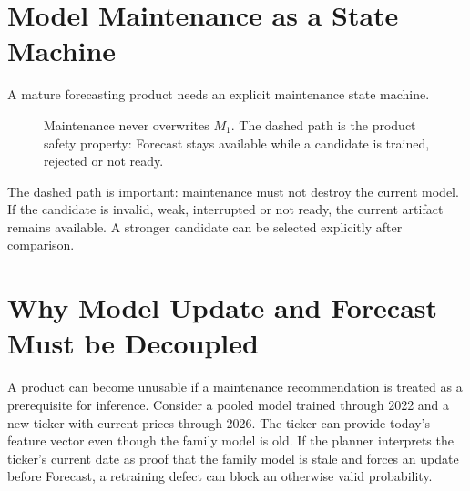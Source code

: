 \documentclass[11pt]{article}
\begin{document}
\section{Model Maintenance as a State Machine}
A mature forecasting product needs an explicit maintenance state machine.
\begin{figure}[ht]
\centering
{}
\caption{Maintenance never overwrites $M_1$. The dashed path is the product safety property: Forecast stays available while a candidate is trained, rejected or not ready.}
\end{figure}

The dashed path is important: maintenance must not destroy the current model. If the candidate is invalid, weak, interrupted or not ready, the current artifact remains available. A stronger candidate can be selected explicitly after comparison.

\section{Why Model Update and Forecast Must be Decoupled}
A product can become unusable if a maintenance recommendation is treated as a prerequisite for inference. Consider a pooled model trained through 2022 and a new ticker with current prices through 2026. The ticker can provide today's feature vector even though the family model is old. If the planner interprets the ticker's current date as proof that the family model is stale and forces an update before Forecast, a retraining defect can block an otherwise valid probability.
\end{document}
